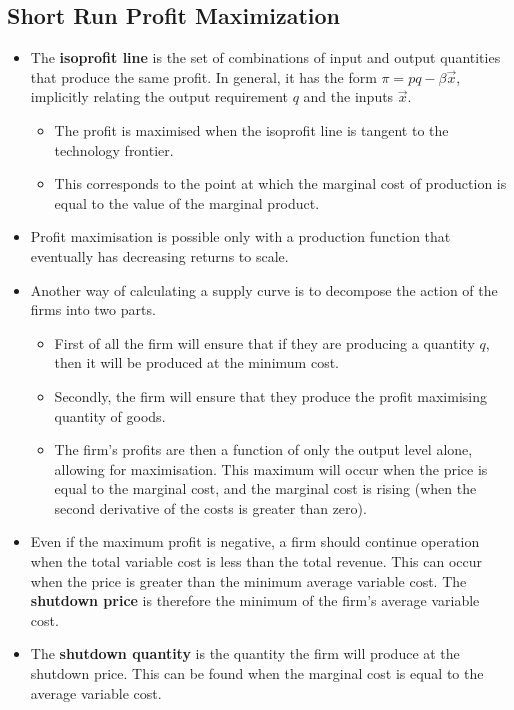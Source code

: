 \documentclass[a4paper]{article}
\begin{document}
\subsection{Short Run Profit Maximization}
\begin{itemize}
    \item The \textbf{isoprofit line} is the set of combinations of input and output quantities that produce the same profit. In general, it has the form $\pi = pq - \beta \vec{x}$, implicitly relating the output requirement $q$ and the inputs $\vec{x}$.
    \begin{itemize}
        \item The profit is maximised when the isoprofit line is tangent to the technology frontier. 
        \item This corresponds to the point at which the marginal cost of production is equal to the value of the marginal product.
    \end{itemize}
    \item Profit maximisation is possible only with a production function that eventually has decreasing returns to scale.
    \item Another way of calculating a supply curve is to decompose the action of the firms into two parts. 
    \begin{itemize}
        \item First of all the firm will ensure that if they are producing a quantity $q$, then it will be produced at the minimum cost. 
        \item Secondly, the firm will ensure that they produce the profit maximising quantity of goods.
        \item The firm's profits are then a function of only the output level alone, allowing for maximisation. This maximum will occur when the price is equal to the marginal cost, and the marginal cost is rising (when the second derivative of the costs is greater than zero).
    \end{itemize} 
    \item Even if the maximum profit is negative, a firm should continue operation when the total variable cost is less than the total revenue. This can occur when the price is greater than the minimum average variable cost. The \textbf{shutdown price} is therefore the minimum of the firm's average variable cost.
    \item The \textbf{shutdown quantity} is the quantity the firm will produce at the shutdown price. This can be found when the marginal cost is equal to the average variable cost.
\end{itemize}
\end{document}
